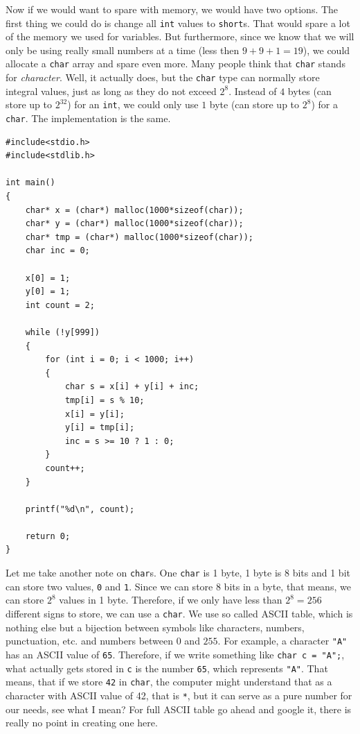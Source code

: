 \documentclass{book}
\begin{document}
Now if we would want to spare with memory, we would have two options. The first thing we could do is change all \texttt{int} values to \texttt{short}s. That would spare a lot of the memory we used for variables. But furthermore, since we know that we will only be using really small numbers at a time (less then $9+9+1 = 19$), we could allocate a \texttt{char} array and spare even more. Many people think that \texttt{char} stands for \textit{character}. Well, it actually does, but the \texttt{char} type can normally store integral values, just as long as they do not exceed $2^8$. Instead of $4$ bytes (can store up to $2^{32}$) for an \texttt{int}, we could only use $1$ byte (can store up to $2^8$) for a \texttt{char}. The implementation is the same.

\begin{verbatim}
#include<stdio.h>
#include<stdlib.h>

int main()
{
    char* x = (char*) malloc(1000*sizeof(char));
    char* y = (char*) malloc(1000*sizeof(char));
    char* tmp = (char*) malloc(1000*sizeof(char));
    char inc = 0;

    x[0] = 1;
    y[0] = 1;
    int count = 2;

    while (!y[999])
    {
        for (int i = 0; i < 1000; i++)
        {
            char s = x[i] + y[i] + inc;
            tmp[i] = s % 10;
            x[i] = y[i];
            y[i] = tmp[i];
            inc = s >= 10 ? 1 : 0;
        }
        count++;
    }

    printf("%d\n", count);

    return 0;
}
\end{verbatim}

Let me take another note on \texttt{char}s. One \texttt{char} is 1 byte, 1 byte is 8 bits and 1 bit can store two values, \texttt{0} and \texttt{1}. Since we can store 8 bits in a byte, that means, we can store $2^8$ values in 1 byte. Therefore, if we only have less than $2^8 = 256$ different signs to store, we can use a \texttt{char}. We use so called ASCII table, which is nothing else but a bijection between symbols like characters, numbers, punctuation, etc. and numbers between $0$ and $255$. For example, a character \texttt{"A"} has an ASCII value of \texttt{65}. Therefore, if we write something like \texttt{char c = "A";}, what actually gets stored in \texttt{c} is the number \texttt{65}, which represents \texttt{"A"}. That means, that if we store \texttt{42} in \texttt{char}, the computer might understand that as a character with ASCII value of 42, that is \texttt{*}, but it can serve as a pure number for our needs, see what I mean? For full ASCII table go ahead and google it, there is really no point in creating one here.
\end{document}
